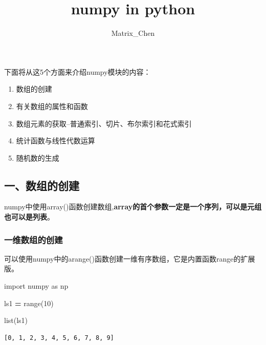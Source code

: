 \documentclass[]{article}
\title{numpy in python}
\author{Matrix\_Chen}
\date{}
\newenvironment{Shaded}{\begin{snugshade}}{\end{snugshade}}
\newcommand{\DecValTok}[1]{\textcolor[rgb]{0.00,0.00,0.81}{#1}}
\newcommand{\ImportTok}[1]{#1}
\newcommand{\OperatorTok}[1]{\textcolor[rgb]{0.81,0.36,0.00}{\textbf{#1}}}
\newcommand{\BuiltInTok}[1]{#1}
\newcommand{\NormalTok}[1]{#1}
\providecommand{\tightlist}{%
  \setlength{\itemsep}{0pt}\setlength{\parskip}{0pt}}
\begin{document}
\maketitle

下面将从这5个方面来介绍numpy模块的内容：

\begin{enumerate}
\def\labelenumi{\arabic{enumi}.}
\tightlist
\item
  数组的创建
\item
  有关数组的属性和函数
\item
  数组元素的获取--普通索引、切片、布尔索引和花式索引
\item
  统计函数与线性代数运算
\item
  随机数的生成
\end{enumerate}

\subsection{一、数组的创建}

numpy中使用array()函数创建数组,\textbf{array的首个参数一定是一个序列，可以是元组也可以是列表}。

\subsubsection{一维数组的创建}

可以使用numpy中的arange()函数创建一维有序数组，它是内置函数range的扩展版。

\begin{Shaded}
\begin{Highlighting}[]
\ImportTok{import}\NormalTok{ numpy }\ImportTok{as}\NormalTok{ np}
\end{Highlighting}
\end{Shaded}

\begin{Shaded}
\begin{Highlighting}[]
\NormalTok{ls1 }\OperatorTok{=} \BuiltInTok{range}\NormalTok{(}\DecValTok{10}\NormalTok{)}
\end{Highlighting}
\end{Shaded}

\begin{Shaded}
\begin{Highlighting}[]
\BuiltInTok{list}\NormalTok{(ls1)}
\end{Highlighting}
\end{Shaded}

\begin{verbatim}
[0, 1, 2, 3, 4, 5, 6, 7, 8, 9]
\end{verbatim}
\end{document}
